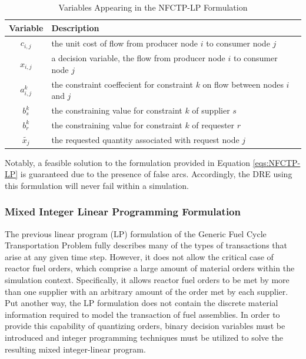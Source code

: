 \begin{table} [h!]
\centering
\begin{tabularx}{\columnwidth-10pt}{|c|X|} %
\hline
Variable    & Description \\
\hline
$c_{i,j}$             & the unit cost of flow
                          from producer node $i$ to consumer node $j$  \\
$x_{i,j}$             & a decision variable, the flow 
                          from producer node $i$ to consumer node $j$  \\
$a_{i,j}^k$ & the constraint coeffecient for constraint $k$ 
                          on flow between nodes $i$ and $j$  \\
$b_s^k$   & the constraining value for constraint $k$ of supplier $s$ \\
$b_r^k$   & the constraining value for constraint $k$ of requester $r$ \\
$\tilde{x_j}$ & the requested quantity associated with request node $j$ \\
\hline
\end{tabularx}
\caption{Variables Appearing in the NFCTP-LP Formulation}
\label{tbl:NFCTP-LP-vars}
\end{table}

Notably, a feasible solution to the formulation provided in Equation
\ref{eqs:NFCTP-LP} is guaranteed due to the presence of false arcs. Accordingly,
the DRE using this formulation will never fail within a simulation.

\subsubsection{Mixed Integer Linear Programming Formulation}\label{abm:dre:milp}

The previous linear program (LP) formulation of the Generic Fuel Cycle
Transportation Problem fully describes many of the types of transactions that
arise at any given time step. However, it does not allow the critical case of
reactor fuel orders, which comprise a large amount of material orders within the
simulation context. Specifically, it allows reactor fuel orders to be met by
more than one supplier with an arbitrary amount of the order met by each
supplier. Put another way, the LP formulation does not contain the discrete
material information required to model the transaction of fuel assemblies. In
order to provide this capability of quantizing orders, binary decision variables
must be introduced and integer programming techniques must be utilized to solve
the resulting mixed integer-linear program.

